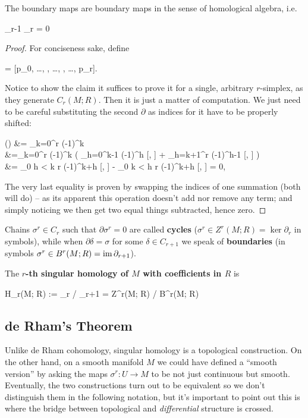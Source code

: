 \documentclass[main.tex]{subfiles}
\begin{document}
\begin{lemma}
	The boundary maps are boundary maps in the sense of homological algebra, i.e.
	\begin{eqalign}
		\partial_{r-1} \partial_r = 0
	\end{eqalign}
\end{lemma}
\begin{proof}
	For conciseness sake, define
	\begin{eqalign}
		 = [p_0, \ldots, , \ldots, , \ldots, p_r].
	\end{eqalign}
	Notice to show the claim it suffices to prove it for a single, arbitrary $r$-simplex, as they generate $C_r(M; R)$. Then it is just a matter of computation. We just need to be careful substituting the second $\partial$ as indices for it have to be properly shifted:
	\begin{eqalign}
		\partial (\partial [p_0, \ldots, p_r]) &= \sum_{k=0}^r (-1)^k \partial [\hat{k}]\\
		&=\sum_{k=0}^r (-1)^k \left( \sum_{h=0}^{k-1} (-1)^h [, ] + \sum_{h=k+1}^r (-1)^{h-1} [, ] \right)\\
		&= \sum_{0 \leq h < k \leq r} (-1)^{k+h} [, ] - \sum_{0 \leq k < h \leq r} (-1)^{k+h} [, ] = 0,
	\end{eqalign}
	The very last equality is proven by swapping the indices of one summation (both will do) -- as its apparent this operation doesn't add nor remove any term; and simply noticing we then get two equal things subtracted, hence zero.
\end{proof}

Chains $\sigma^r \in C_r$ such that $\partial \sigma^r = 0$ are called \textbf{cycles} ($\sigma^r \in Z^r(M; R) = \ker \partial_r$ in symbols), while when $\partial \delta = \sigma$ for some $\delta \in C_{r+1}$ we speak of \textbf{boundaries} (in symbols $\sigma^r \in B^r(M; R) = \operatorname{im} \partial_{r+1}$).

\begin{definition}
	The \textbf{$r$-th singular homology of $M$ with coefficients in $R$} is
	\begin{eqalign}
		H_r(M; R) := \ker \partial_r / \im \partial_{r+1} = Z^r(M; R) / B^r(M; R)
	\end{eqalign}
\end{definition}

\subsection{de Rham's Theorem}
\label{subsec:de_rham}
Unlike de Rham cohomology, singular homology is a topological construction. On the other hand, on a smooth manifold $M$ we could have defined a ``smooth version'' by asking the maps $\sigma^r : U \to M$ to be not just continuous but smooth. Eventually, the two constructions turn out to be equivalent so we don't distinguish them in the following notation, but it's important to point out this is where the bridge between topological and \emph{differential} structure is crossed.
\end{document}
